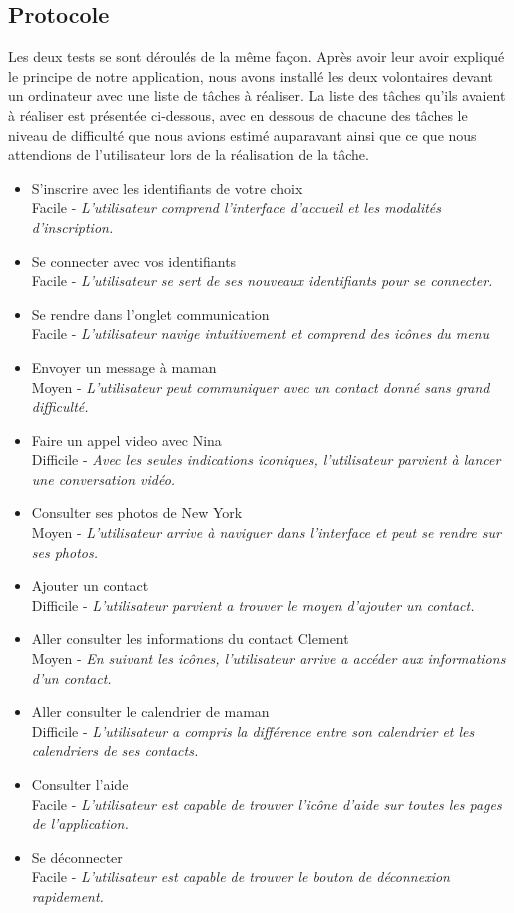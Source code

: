 \documentclass[11pt]{article}
\begin{document}
\subsection{Protocole}
Les deux tests se sont déroulés de la même façon. Après avoir leur avoir expliqué le principe de notre application, nous avons installé les deux volontaires devant un ordinateur avec une liste de tâches à réaliser. La liste des tâches qu'ils avaient à réaliser est présentée ci-dessous, avec en dessous de chacune des tâches le niveau de difficulté que nous avions estimé auparavant ainsi que ce que nous attendions de l'utilisateur lors de la réalisation de la tâche.

\begin{itemize}
\item S’inscrire avec les identifiants de votre choix \\ Facile - \textit{L'utilisateur comprend l'interface d'accueil et les modalités d'inscription.}
\item Se connecter avec vos identifiants \\ Facile - \textit{L'utilisateur se sert de ses nouveaux identifiants pour se connecter.}
\item Se rendre dans l’onglet communication \\ Facile -  \textit{L'utilisateur navige intuitivement et comprend des icônes du menu}
\item Envoyer un message à maman \\ Moyen - \textit{L'utilisateur peut communiquer avec un contact donné sans grand difficulté.}
\item Faire un appel video avec Nina \\ Difficile - \textit{Avec les seules indications iconiques, l'utilisateur parvient à lancer une conversation vidéo.}
\item Consulter ses photos de New York \\ Moyen -  \textit{L'utilisateur arrive à naviguer dans l'interface et peut se rendre sur ses photos.}
\item Ajouter un contact \\  Difficile -  \textit{L'utilisateur parvient a trouver le moyen d'ajouter un contact.}
\item Aller consulter les informations du contact Clement \\ Moyen - \textit{En suivant les icônes, l'utilisateur arrive a accéder aux informations d'un contact.}
\item Aller consulter le calendrier de maman \\ Difficile - \textit{L'utilisateur a compris la différence entre son calendrier et les calendriers de ses contacts.}
\item Consulter l’aide \\ Facile - \textit{L'utilisateur est capable de trouver l'icône d'aide sur toutes les pages de l'application.}
\item Se déconnecter \\ Facile - \textit{L'utilisateur est capable de trouver le bouton de déconnexion rapidement.}
\end{itemize}
\end{document}
